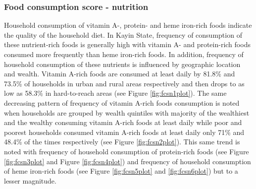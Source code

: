 \documentclass[12pt,a4paper]{article}
\begin{document}
\newpage

\hypertarget{fcsn-results}{%
\subsubsection{Food consumption score - nutrition}\label{fcsn-results}}

Household consumption of vitamin A-, protein- and heme iron-rich foods indicate the quality of the household diet. In Kayin State, frequency of consumption of these nutrient-rich foods is generally high with vitamin A- and protein-rich foods consumed more frequently than heme iron-rich foods. In addition, frequency of household consumption of these nutrients is influenced by geographic location and wealth. Vitamin A-rich foods are consumed at least daily by 81.8\% and 73.5\% of households in urban and rural areas respectively and then drops to as low as 58.3\% in hard-to-reach areas (see Figure \ref{fig:fcsn1plot}). The same decreasing pattern of frequency of vitamin A-rich foods consumption is noted when households are grouped by wealth quintiles with majority of the wealthiest and the wealthy consuming vitamin A-rich foods at least daily while poor and poorest households consumed vitamin A-rich foods at least daily only 71\% and 48.4\% of the times respectively (see Figure \ref{fig:fcsn2plot}). This same trend is noted with frequency of household consumption of protein-rich foods (see Figure \ref{fig:fcsn3plot} and Figure \ref{fig:fcsn4plot}) and frequency of household consumption of heme iron-rich foods (see Figure \ref{fig:fcsn5plot} and \ref{fig:fcsn6plot}) but to a lesser magnitude.
\end{document}
